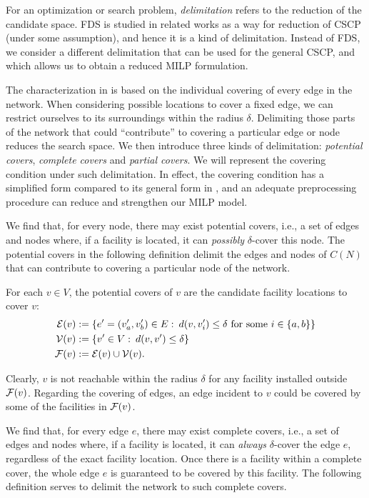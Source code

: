 For an optimization or search problem, \textit{delimitation} refers to the reduction of the candidate space. FDS is studied in related works as a way for reduction of CSCP (under some assumption), and hence it is a kind of delimitation. Instead of FDS, we consider a different delimitation that can be used for the general CSCP, and which allows us to obtain a reduced MILP formulation.

The characterization in  is based on the individual covering of every edge in the network. When considering possible locations to cover a fixed edge, we can restrict ourselves to its surroundings within the radius $\delta$. Delimiting those parts of the network that could ``contribute'' to covering a particular edge or node reduces the search space. We  then introduce three kinds of delimitation: \textit{potential covers}, \textit{complete covers} and \textit{partial covers}.   We will represent the covering condition under such delimitation. In effect, the covering condition has a simplified form compared to its general form in , and an adequate preprocessing procedure can reduce and strengthen our MILP model.

We find that, for every node, there may exist potential covers, i.e., a set of edges and nodes where, if a facility is located, it can \textit{possibly} $\delta$-cover this node.  The potential covers in the following definition delimit the edges and nodes of $C(N)$ that can contribute to covering a particular node of the network.
\begin{definition}\label{defa.linksetsv}
For each $v \in V$, the potential covers of $v$ are the candidate facility locations to cover $v$:
\begin{align}
 {\mathcal E}(v)&:= \{e'=(v'_a,v'_b) \in E:\:   d(v,v'_{i}) \le \delta \textup{ for some } i\in \{a,b\} \} \nonumber\\
 \mathcal V(v)&:= \{v' \in V: \:  d(v,v') \le \delta\} \nonumber\\
 \mathcal F(v)&:= {\mathcal E}(v) \cup \mathcal V(v). \nonumber
\end{align}
\end{definition}
Clearly, $v$ is not reachable within the radius $\delta$ for any facility installed outside $\mathcal F(v)$. Regarding the covering of edges, an edge incident to $v$ could be covered by some of the facilities in $\mathcal F(v)$.

We find that, for every edge $e$, there may exist complete covers, i.e., a set of edges and nodes where, if a facility is located, it can \textit{always} $\delta$-cover the edge $e$, regardless of the exact facility location. Once there is a facility within a complete cover, the whole edge $e$ is guaranteed to be covered by this facility. The following definition serves to delimit the network to such complete covers.

